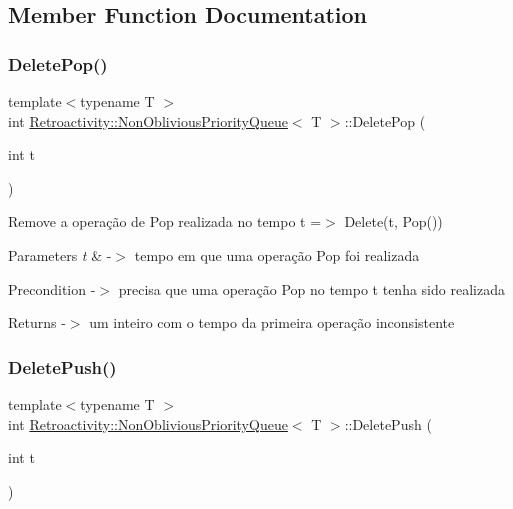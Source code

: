 \subsection{Member Function Documentation}
\mbox{\label{classRetroactivity_1_1NonObliviousPriorityQueue_a1098d1d1bf1be62fd384fbe1905a8f2a}} 
\subsubsection{\texorpdfstring{Delete\+Pop()}{DeletePop()}}
{\footnotesize\ttfamily template$<$typename T $>$ \\
int \hyperlink{classRetroactivity_1_1NonObliviousPriorityQueue}{Retroactivity\+::\+Non\+Oblivious\+Priority\+Queue}$<$ T $>$\+::Delete\+Pop (\begin{DoxyParamCaption}\item[{int}]{t }\end{DoxyParamCaption})}

Remove a operação de Pop realizada no tempo t =$>$ Delete(t, Pop())


\begin{DoxyParams}{Parameters}
{\em t} & -\/$>$ tempo em que uma operação Pop foi realizada \\
\hline
\end{DoxyParams}
\begin{DoxyPrecond}{Precondition}
-\/$>$ precisa que uma operação Pop no tempo t tenha sido realizada 
\end{DoxyPrecond}
\begin{DoxyReturn}{Returns}
-\/$>$ um inteiro com o tempo da primeira operação inconsistente 
\end{DoxyReturn}
\mbox{\label{classRetroactivity_1_1NonObliviousPriorityQueue_a1b65ca1c3b88ce7ae5975794abc6593b}} 
\subsubsection{\texorpdfstring{Delete\+Push()}{DeletePush()}}
{\footnotesize\ttfamily template$<$typename T $>$ \\
int \hyperlink{classRetroactivity_1_1NonObliviousPriorityQueue}{Retroactivity\+::\+Non\+Oblivious\+Priority\+Queue}$<$ T $>$\+::Delete\+Push (\begin{DoxyParamCaption}\item[{int}]{t }\end{DoxyParamCaption})}

